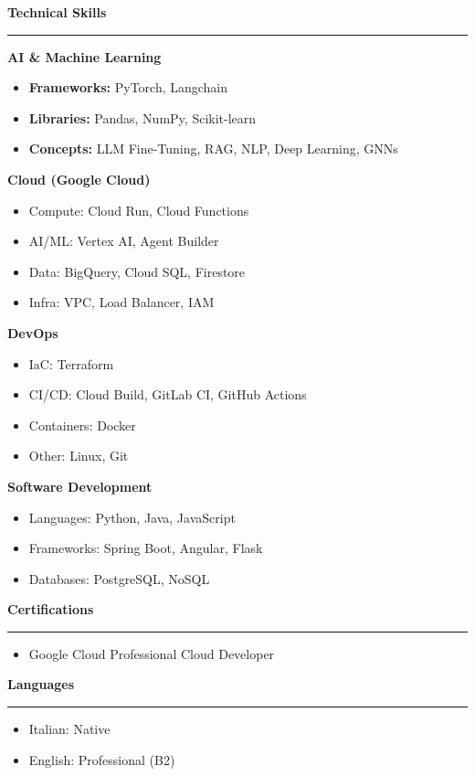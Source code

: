 \documentclass[9pt, a4paper]{article}
\newcommand{\cvsection}[1]{%
	\vspace{8pt}\par
	{\Large\bfseries\color{sectionblue}#1}\par
	\vspace{2pt}\hrule\vspace{6pt}
}
\begin{document}
\begin{paracol}{2}
		\cvsection{Technical Skills}
		
		{\bfseries AI \& Machine Learning}
		\begin{itemize}[leftmargin=*, nosep, itemsep=2pt]
			\item \textbf{Frameworks:} PyTorch, Langchain
			\item \textbf{Libraries:} Pandas, NumPy, Scikit-learn
			\item \textbf{Concepts:} LLM Fine-Tuning, RAG, NLP, Deep Learning, GNNs
		\end{itemize}
		
		{\bfseries Cloud (Google Cloud)}
		\begin{itemize}[leftmargin=*, nosep, itemsep=2pt]
			\item Compute: Cloud Run, Cloud Functions
			\item AI/ML: Vertex AI, Agent Builder
			\item Data: BigQuery, Cloud SQL, Firestore
			\item Infra: VPC, Load Balancer, IAM
		\end{itemize}
		
		{\bfseries DevOps}
		\begin{itemize}[leftmargin=*, nosep, itemsep=2pt]
			\item IaC: Terraform
			\item CI/CD: Cloud Build, GitLab CI, GitHub Actions
			\item Containers: Docker
			\item Other: Linux, Git
		\end{itemize}
		
		{\bfseries Software Development}
		\begin{itemize}[leftmargin=*, nosep, itemsep=2pt]
			\item Languages: Python, Java, JavaScript
			\item Frameworks: Spring Boot, Angular, Flask
			\item Databases: PostgreSQL, NoSQL
		\end{itemize}
		
		\cvsection{Certifications}
		\begin{itemize}[leftmargin=*, nosep, itemsep=2pt]
			\item Google Cloud Professional Cloud Developer
		\end{itemize}
		
		\cvsection{Languages}
		\begin{itemize}[leftmargin=*, nosep, itemsep=2pt]
			\item Italian: Native
			\item English: Professional (B2)
		\end{itemize}
		
	\end{paracol}
\end{document}
